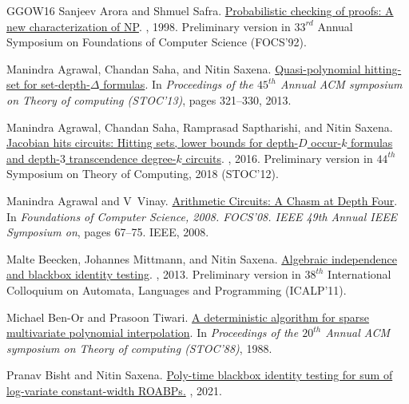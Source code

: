 \documentclass[10pt,a4paper]{article}
\numberwithin{equation}{section}
\begin{document}
\begin{thebibliography}{GGOW16}
Sanjeev Arora and Shmuel Safra.
\newblock \href{https://dl.acm.org/doi/10.1145/273865.273901}{Probabilistic
  checking of proofs: A new characterization of {NP}}.
, 1998.
\newblock Preliminary version in $33^{rd}$ Annual Symposium on Foundations of
  Computer Science (FOCS'92).

Manindra Agrawal, Chandan Saha, and Nitin Saxena.
\newblock
  \href{https://dl.acm.org/doi/10.1145/2488608.2488649}{Quasi-polynomial
  hitting-set for set-depth-{$\Delta$} formulas}.
\newblock In {\em Proceedings of the $45^{th}$ Annual ACM symposium on Theory
  of computing (STOC'13)}, pages 321--330, 2013.

Manindra Agrawal, Chandan Saha, Ramprasad Saptharishi, and Nitin Saxena.
\newblock \href{https://epubs.siam.org/doi/abs/10.1137/130910725}{Jacobian hits
  circuits: Hitting sets, lower bounds for depth-{$D$} occur-$k$ formulas and
  depth-$3$ transcendence degree-$k$ circuits}.
, 2016.
\newblock Preliminary version in $44^{th}$ Symposium on Theory of Computing,
  2018 (STOC'12).

Manindra Agrawal and V~Vinay.
\newblock \href{https://ieeexplore.ieee.org/document/4690941}{Arithmetic
  Circuits: A Chasm at Depth Four}.
\newblock In {\em Foundations of Computer Science, 2008. FOCS'08. IEEE 49th
  Annual IEEE Symposium on}, pages 67--75. IEEE, 2008.

Malte Beecken, Johannes Mittmann, and Nitin Saxena.
\newblock
  \href{https://www.sciencedirect.com/science/article/pii/S0890540112001435}{Algebraic
  independence and blackbox identity testing}.
, 2013.
\newblock Preliminary version in $38^{th}$ International Colloquium on
  Automata, Languages and Programming (ICALP'11).

Michael Ben-Or and Prasoon Tiwari.
\newblock \href{https://dl.acm.org/doi/abs/10.1145/62212.62241}{A deterministic
  algorithm for sparse multivariate polynomial interpolation}.
\newblock In {\em Proceedings of the $20^{th}$ Annual ACM symposium on Theory
  of computing (STOC'88)}, 1988.

Pranav Bisht and Nitin Saxena.
\newblock
  \href{https://cse.iitk.ac.in/users/nitin/papers/constWidth-log-var.pdf}{Poly-time
  blackbox identity testing for sum of log-variate constant-width ROABPs.}
, 2021.


\end{thebibliography}
\end{document}
